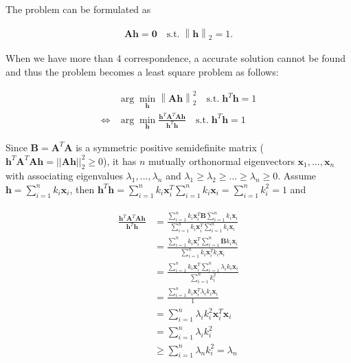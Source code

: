 \documentclass[11pt]{article}
\begin{document}
\newcommand{\norm}[1]{\left\lVert#1\right\rVert}
\newcommand{\bx}{\mathbf{x}}
\newcommand{\bh}{\mathbf{h}}
\newcommand{\bA}{\mathbf{A}}
\newcommand{\bB}{\mathbf{B}}

The problem can be formulated as

\begin{align}
    \mathbf{Ah} = \mathbf{0} \quad
    \textrm{s.t.} \; \norm{\mathbf{h}}_2 = 1 .
\end{align}

When we have more than 4 correspondence, a accurate solution cannot be found and thus the problem becomes a least square problem as follows:

\begin{align}
    & \arg\min_{\mathbf{h}} \norm{\mathbf{Ah}}^2_2
    \quad \textrm{s.t.} \; \mathbf{h}^T \mathbf{h} = 1
    \\ \Leftrightarrow
    & \arg\min_{\mathbf{h}}
    \frac{\mathbf{h}^T\mathbf{A}^T\mathbf{A}\mathbf{h}}{\mathbf{h}^T\mathbf{h}}
    \quad \textrm{s.t.} \; \mathbf{h}^T \mathbf{h} = 1
\end{align}

Since $\bB = \bA^T\bA$ is a symmetric positive semidefinite matrix ($\bh^T\bA^T\bA\bh=||\bA\bh||_2^2\geq 0$), it has $n$ mutually orthonormal eigenvectors $\bx_1, \dots, \bx_n$ with associating eigenvalues $\lambda_1,\dots,\lambda_n$ and  $\lambda_1 \geq \lambda_2 \geq \dots \geq \lambda_n \geq 0$. Assume $\bh=\sum_{i=1}^n k_i\bx_i$, then $\bh^T\bh=\sum_{i=1}^n k_i\bx_i^T \sum_{i=1}^n k_i\bx_i= \sum_{i=1}^n k_i^2 = 1$ and

\begin{align}
\begin{split}
  \frac{\bh^T\bA^T\bA\bh}{\bh^T\bh} &=
  \frac{\sum_{i=1}^n k_i\bx_i^T \bB \sum_{i=1}^n k_i\bx_i}{\sum_{i=1}^n k_i\bx_i^T \sum_{i=1}^n k_i\bx_i} \\
  &= \frac{\sum_{i=1}^n k_i\bx_i^T \sum_{i=1}^n \bB k_i\bx_i}{\sum_{i=1}^n k_i\bx_i^T k_i\bx_i} \\
  &= \frac{\sum_{i=1}^n k_i\bx_i^T \sum_{i=1}^n \lambda_i k_i\bx_i}{\sum_{i=1}^n k_i^2 } \\
  &= \frac{\sum_{i=1}^n k_i\bx_i^T \lambda_i k_i\bx_i}{1 } \\
  &= \sum_{i=1}^n \lambda_i k_i^2 \bx_i^T \bx_i \\
  &= \sum_{i=1}^n \lambda_i k_i^2 \\
  &\geq \sum_{i=1}^n \lambda_n k_i^2 = \lambda_n
\end{split}
\end{align}
\end{document}
